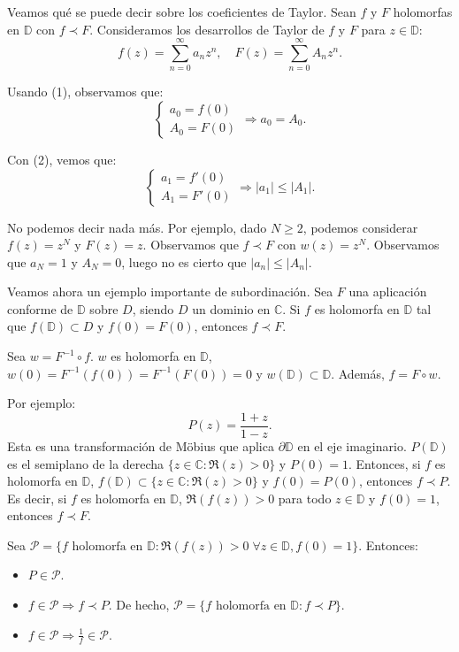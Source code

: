 \begin{remark}
    Veamos qué se puede decir sobre los coeficientes de Taylor.
    Sean $f$ y $F$ holomorfas en $\mathbb{D}$ con $f \prec F$.
    Consideramos los desarrollos de Taylor de $f$ y $F$ para $z \in \mathbb{D}$:
    $$f(z) = \sum_{n=0}^\infty a_nz^n, \quad F(z) = \sum_{n=0}^\infty A_nz^n.$$

    Usando (1), observamos que:
    $$\begin{cases}
            a_0 = f(0) \\
            A_0 = F(0)
        \end{cases} \Rightarrow a_0 = A_0.$$

    Con (2), vemos que:
    $$\begin{cases}
            a_1 = f'(0) \\
            A_1 = F'(0)
        \end{cases} \Rightarrow |a_1| \leq |A_1|.$$

    No podemos decir nada más.
    Por ejemplo, dado $N \geq 2$, podemos considerar $f(z) = z^N$ y $F(z) = z$.
    Observamos que $f \prec F$ con $w(z) = z^N$.
    Observamos que $a_N = 1$ y $A_N = 0$, luego no es cierto que $|a_n| \leq |A_n|$.
\end{remark}

Veamos ahora un ejemplo importante de subordinación.
Sea $F$ una aplicación conforme de $\mathbb{D}$ sobre $D$, siendo $D$ un dominio en $\mathbb{C}$.
Si $f$ es holomorfa en $\mathbb{D}$ tal que $f(\mathbb{D}) \subset D$ y $f(0) = F(0)$, entonces $f \prec F$.

Sea $w = F^{-1} \circ f$.
$w$ es holomorfa en $\mathbb{D}$, $w(0) = F^{-1}(f(0)) = F^{-1}(F(0)) = 0$ y $w(\mathbb{D}) \subset \mathbb{D}$.
Además, $f = F \circ w$.

Por ejemplo:
$$P(z) = \frac{1+z}{1-z}.$$
Esta es una transformación de Möbius que aplica $\partial \mathbb{D}$ en el eje imaginario.
$P(\mathbb{D})$ es el semiplano de la derecha $\{z \in \mathbb{C} : \Re(z) > 0\}$ y $P(0) = 1$.
Entonces, si $f$ es holomorfa en $\mathbb{D}$, $f(\mathbb{D}) \subset \{z \in \mathbb{C} : \Re(z) > 0\}$ y $f(0) = P(0)$, entonces $f \prec P$.
Es decir, si $f$ es holomorfa en $\mathbb{D}$, $\Re(f(z)) > 0$ para todo $z \in \mathbb{D}$ y $f(0) = 1$, entonces $f \prec F$.

Sea $\mathcal{P} = \{f \text{ holomorfa en } \mathbb{D} : \Re(f(z)) > 0 \; \forall z \in \mathbb{D}, f(0) = 1\}$.
Entonces:
\begin{itemize}
    \item $P \in \mathcal{P}$.
    \item $f \in \mathcal{P} \Rightarrow f \prec P$.
          De hecho, $\mathcal{P} = \{f \text{ holomorfa en } \mathbb{D} : f \prec P\}$.
    \item $f \in \mathcal{P} \Rightarrow \frac{1}{f} \in \mathcal{P}$.
\end{itemize}

